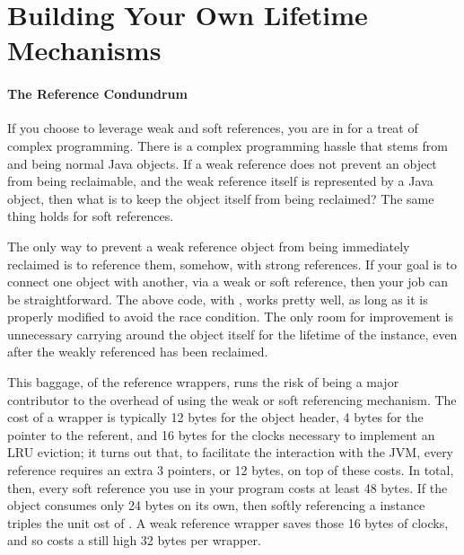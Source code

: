 
\section{Building Your Own Lifetime Mechanisms}
\paragraph{The Reference Condundrum}

If you choose to leverage weak and soft references, you are in for a treat of
complex programming. There is a complex programming hassle that stems from
 and  being normal Java objects. If a
weak reference does not prevent an object from being reclaimable, and the weak
reference itself is represented by a Java object, then what is to keep the
 object itself from being reclaimed? The same thing holds
for soft references.

The only way to prevent a weak reference object from being immediately reclaimed
is to reference them, somehow, with strong references. If your goal is to
connect one object with another, via a weak or soft reference, then your job can be
straightforward. The above code, with , works pretty well, as long
as it is properly modified to avoid the race condition. The only room for
improvement is unnecessary carrying around the  object
itself for the lifetime of the  instance, even after the weakly
referenced  has been reclaimed.

This baggage, of the reference wrappers, runs the risk of being a major
contributor to the overhead of using the weak or soft referencing mechanism. The
cost of a  wrapper is typically 12 bytes for the object
header, 4 bytes for the pointer to the referent, and 16 bytes for the clocks
necessary to implement an LRU eviction; it turns out that, to facilitate the
interaction with the JVM, every reference requires an extra 3 pointers, or 12
bytes, on top of these costs. In total, then, every soft reference you use in
your program costs at least 48 bytes. If the  object consumes only 24
bytes on its own, then softly referencing a  instance triples the unit
ost of . A weak reference wrapper saves those 16 bytes of clocks, and
so costs a still high 32 bytes per wrapper.

